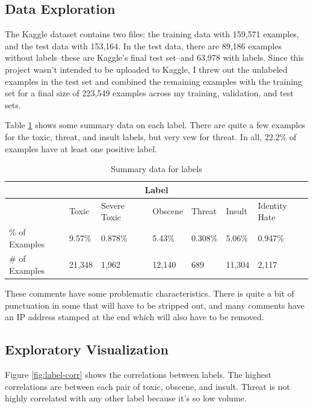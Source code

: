 \documentclass[12pt]{article}
\begin{document}
\subsection*{Data Exploration}
\label{sec:org765114b}
The Kaggle dataset contains two files: the training data with 159,571 examples, and the test data with 153,164. In the test data, there are 89,186 examples without labels--these are Kaggle's final test set--and 63,978 with labels. Since this project wasn't intended to be uploaded to Kaggle, I threw out the unlabeled examples in the test set and combined the remaining examples with the training set for a final size of 223,549 examples across my training, validation, and test sets.

Table \ref{table:1} shows some summary data on each label. There are quite a few examples for the toxic, threat, and insult labels, but very vew for threat. In all, 22.2\% of examples have at least one positive label.

\begin{center}
\begin{table}
\begin{tabular}{| m{5em} | m{1.5cm} | m{1.5cm} | m{1.5cm} | m{1.5cm} | m{1.5cm} | m{1.5cm} |}
\hline
\multicolumn{7}{|c|}{Label} \\
\hline
& Toxic & Severe Toxic & Obscene & Threat & Insult & Identity Hate \\
\hline
\% of Examples & 9.57\% & 0.878\% & 5.43\% & 0.308\% & 5.06\% & 0.947\% \\
\hline
\# of Examples & 21,348 & 1,962 & 12,140 & 689 & 11,304 & 2,117 \\
\hline
\end{tabular}
\caption{Summary data for labels}
\label{table:1}
\end{table}
\end{center}

These comments have some problematic characteristics. There is quite a bit of punctuation in some that will have to be stripped out, and many comments have an IP address stamped at the end which will also have to be removed.

\subsection*{Exploratory Visualization}
\label{sec:org6b72732}

Figure \ref{fig:label-corr} shows the correlations between labels. The highest correlations are between each pair of toxic, obscene, and insult. Threat is not highly correlated with any other label because it's so low volume. 
\end{document}
